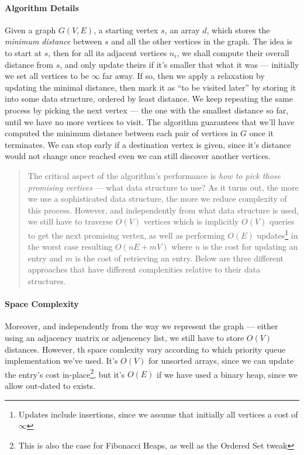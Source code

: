 \documentclass[12pt]{article}
\begin{document}
\paragraph{Algorithm Details} Given a graph $G(V,E)$, a starting vertex $s$, an array $d$, which stores the \textit{minimum distance} between $s$ and all the other vertices in the graph. The idea is to start at $s$, then for all its adjacent vertices $n_i$, we shall compute their overall distance from $s$, and only update theirs if it's smaller that what it was --- initially we set all vertices to be $\infty$ far away. If so, then we apply a relaxation by updating the minimal distance, then mark it as ``to be visited later'' by storing it into some data structure, ordered by least distance. We keep repeating the same process by picking the next vertex --- the one with the smallest distance so far, until we have no more vertices to visit. The algorithm guarantees that we'll have computed the minimum distance between each pair of vertices in $G$ once it terminates. We can stop early if a destination vertex is given, since it's distance would not change once reached even we can still discover another vertices.

\begin{quotation}
The critical aspect of the algorithm's performance is \textit{how to pick those promising vertices} --- what data structure to use? As it turns out, the more we use a sophisticated data structure, the more we reduce complexity of this process. However, and independently from what data structure is used, we still have to traverse $O(V)$ vertices which is implicitly $O(V)$ queries to get the next promising vertex, as well as performing $O(E)$ updates\footnote{Updates include insertions, since we assume that initially all vertices a cost of $\infty$} in the worst case resulting $O(nE + mV)$ where $n$ is the cost for updating an entry and $m$ is the cost of retrieving an entry. Below are three different approaches that have different complexities relative to their data structures.
\end{quotation}

\paragraph{Space Complexity} Moreover, and independently from the way we represent the graph --- either using an adjacency matrix or adjencency list, we still have to store $O(V)$ distances. However, th space comlexity vary according to which priority queue implementation we've used. It's $O(V)$ for unsorted arrays, since we can update the entry's cost in-place\footnote{This is also the case for Fibonacci Heaps, as well as the Ordered Set tweak}, but it's $O(E)$ if we have used a binary heap, since we allow out-dated to exists.
\end{document}
